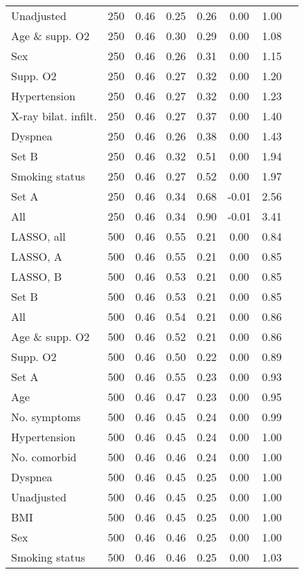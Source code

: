 \documentclass{article}
\begin{document}
{\begin{longtable}{lccccccc}
Unadjusted & 250 & 0.46 & 0.25 & 0.26 & 0.00 & 1.00\\
Age \& supp. O2 & 250 & 0.46 & 0.30 & 0.29 & 0.00 & 1.08\\
Sex & 250 & 0.46 & 0.26 & 0.31 & 0.00 & 1.15\\
Supp. O2 & 250 & 0.46 & 0.27 & 0.32 & 0.00 & 1.20\\
Hypertension & 250 & 0.46 & 0.27 & 0.32 & 0.00 & 1.23\\
X-ray bilat. infilt. & 250 & 0.46 & 0.27 & 0.37 & 0.00 & 1.40\\
Dyspnea & 250 & 0.46 & 0.26 & 0.38 & 0.00 & 1.43\\
Set B & 250 & 0.46 & 0.32 & 0.51 & 0.00 & 1.94\\
Smoking status & 250 & 0.46 & 0.27 & 0.52 & 0.00 & 1.97\\
Set A & 250 & 0.46 & 0.34 & 0.68 & -0.01 & 2.56\\
All & 250 & 0.46 & 0.34 & 0.90 & -0.01 & 3.41\\ \midrule
LASSO, all & 500 & 0.46 & 0.55 & 0.21 & 0.00 & 0.84\\
LASSO, A & 500 & 0.46 & 0.55 & 0.21 & 0.00 & 0.85\\
LASSO, B & 500 & 0.46 & 0.53 & 0.21 & 0.00 & 0.85\\
Set B & 500 & 0.46 & 0.53 & 0.21 & 0.00 & 0.85\\
All & 500 & 0.46 & 0.54 & 0.21 & 0.00 & 0.86\\
Age \& supp. O2 & 500 & 0.46 & 0.52 & 0.21 & 0.00 & 0.86\\
Supp. O2 & 500 & 0.46 & 0.50 & 0.22 & 0.00 & 0.89\\
Set A & 500 & 0.46 & 0.55 & 0.23 & 0.00 & 0.93\\
Age & 500 & 0.46 & 0.47 & 0.23 & 0.00 & 0.95\\
No. symptoms & 500 & 0.46 & 0.45 & 0.24 & 0.00 & 0.99\\
Hypertension & 500 & 0.46 & 0.45 & 0.24 & 0.00 & 1.00\\
No. comorbid & 500 & 0.46 & 0.46 & 0.24 & 0.00 & 1.00\\
Dyspnea & 500 & 0.46 & 0.45 & 0.25 & 0.00 & 1.00\\
Unadjusted & 500 & 0.46 & 0.45 & 0.25 & 0.00 & 1.00\\
BMI & 500 & 0.46 & 0.45 & 0.25 & 0.00 & 1.00\\
Sex & 500 & 0.46 & 0.46 & 0.25 & 0.00 & 1.00\\
Smoking status & 500 & 0.46 & 0.46 & 0.25 & 0.00 & 1.03\\

\end{longtable}}
\end{document}
